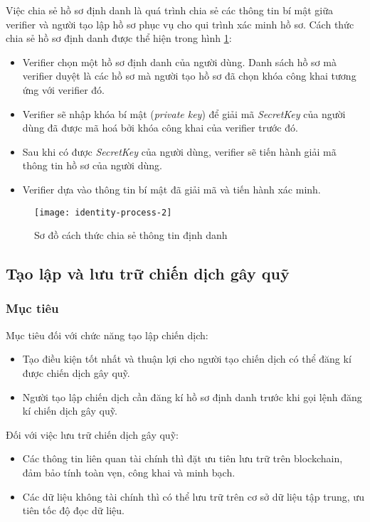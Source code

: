 \documentclass[../main-report.tex]{subfiles}
\begin{document}
Việc chia sẻ hồ sơ định danh là quá trình chia sẻ các thông tin bí mật giữa verifier và người tạo lập hồ sơ phục vụ cho qui trình xác minh hồ sơ. Cách thức chia sẻ hồ sơ định danh được thể hiện trong hình \ref{fig:identity-process-2}:

\begin{itemize}
\item Verifier chọn một hồ sơ định danh của người dùng. Danh sách hồ sơ mà verifier duyệt là các hồ sơ mà người tạo hồ sơ đã chọn khóa công khai tương ứng với verifier đó.
\item Verifier sẽ nhập khóa bí mật (\textit{private key}) để giải mã \textit{SecretKey} của người dùng đã được mã hoá bởi khóa công khai của verifier trước đó.
\item Sau khi có được \textit{SecretKey} của người dùng, verifier sẽ tiến hành giải mã thông tin hồ sơ của người dùng.
\item Verifier dựa vào thông tin bí mật đã giải mã và tiến hành xác minh.
\end{itemize}

\begin{figure}[ht!]
\begin{center}
\label{fig:identity-process-2}
\texttt{[image: identity-process-2]}
\caption{Sơ đồ cách thức chia sẻ thông tin định danh}
\end{center}
\end{figure}

\subsection{Tạo lập và lưu trữ chiến dịch gây quỹ}
\subsubsection{Mục tiêu}
Mục tiêu đối với chức năng tạo lập chiến dịch:

\begin{itemize}
\item Tạo điều kiện tốt nhất và thuận lợi cho người tạo chiến dịch có thể đăng kí được chiến dịch gây quỹ.
\item Người tạo lập chiến dịch cần đăng kí hồ sơ định danh trước khi gọi lệnh đăng kí chiến dịch gây quỹ.
\end{itemize}

Đối với việc lưu trữ chiến dịch gây quỹ:

\begin{itemize}
\item Các thông tin liên quan tài chính thì đặt ưu tiên lưu trữ trên \gls{blockchain}, đảm bảo tính toàn vẹn, công khai và minh bạch.
\item Các dữ liệu không tài chính thì có thể lưu trữ trên cơ sở dữ liệu tập trung, ưu tiên tốc độ đọc dữ liệu.
\end{itemize}
\end{document}
